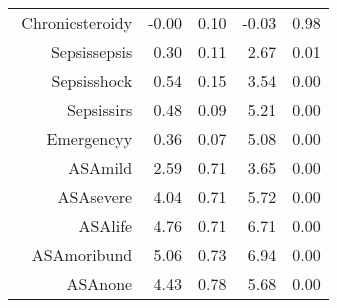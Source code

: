 \begin{tabular}{rrrrr}
$$  Chronic\-steroid\-y & -0.00 & 0.10 & -0.03 & 0.98 \\ 
  Sepsis\-sepsis & 0.30 & 0.11 & 2.67 & 0.01 \\ 
  Sepsis\-shock & 0.54 & 0.15 & 3.54 & 0.00 \\ 
  Sepsis\-sirs & 0.48 & 0.09 & 5.21 & 0.00 \\ 
  Emergency\-y & 0.36 & 0.07 & 5.08 & 0.00 \\ 
  ASA\-mild & 2.59 & 0.71 & 3.65 & 0.00 \\ 
  ASA\-severe & 4.04 & 0.71 & 5.72 & 0.00 \\ 
  ASA\-life & 4.76 & 0.71 & 6.71 & 0.00 \\ 
  ASA\-moribund & 5.06 & 0.73 & 6.94 & 0.00 \\ 
  ASA\-none & 4.43 & 0.78 & 5.68 & 0.00 \\ 
   \hline
\end{tabular}

